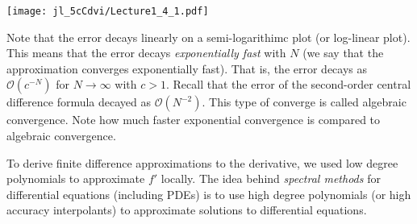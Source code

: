 \documentclass[12pt,a4paper]{article}
\begin{document}
\texttt{[image: jl\_5cCdvi/Lecture1\_4\_1.pdf]}

Note that the error decays linearly on a semi-logarithimc plot (or log-linear plot).  This means that the error decays \emph{exponentially fast} with $N$ (we say that the approximation converges exponentially fast).  That is, the error decays as $\mathcal{O}(c^{-N})$ for $N \to \infty$ with $c > 1$.  Recall that the error of the second-order central difference formula decayed as $\mathcal{O}(N^{-2})$.  This type of converge is  called algebraic convergence.  Note how much faster exponential convergence is compared to algebraic convergence.

To derive finite difference approximations to the derivative, we used low degree polynomials to approximate $f'$ locally.  The idea behind \emph{spectral methods} for differential equations (including PDEs) is to use high degree polynomials (or high accuracy interpolants) to approximate solutions to differential equations.
\end{document}
